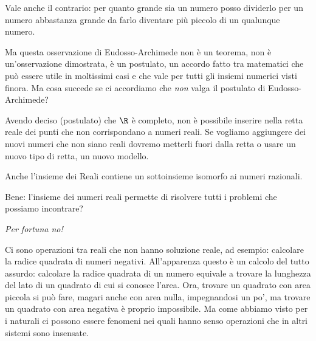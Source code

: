 Vale anche il contrario: per quanto grande sia un numero posso dividerlo per un 
numero abbastanza grande da farlo diventare più piccolo di un qualunque numero.

Ma questa osservazione di Eudosso-Archimede non è un teorema, non è 
un'osservazione dimostrata, è un postulato, un accordo fatto tra matematici che 
può essere utile in moltissimi casi e che vale per tutti gli insiemi numerici 
visti finora. Ma cosa succede se ci accordiamo che \emph{non} valga il 
postulato di Eudosso-Archimede? 

Avendo deciso (postulato) che \(\R\) è completo, non è possibile inserire nella 
retta reale dei punti che non corrispondano a numeri reali. Se vogliamo 
aggiungere dei nuovi numeri che non siano reali dovremo metterli fuori dalla 
retta o usare un nuovo tipo di retta, un nuovo modello.
% 
% 

Anche l'insieme dei Reali contiene un sottoinsieme isomorfo ai numeri razionali.

Bene: l'insieme dei numeri reali permette di risolvere tutti i problemi che 
possiamo incontrare? 

\vspace{-1em} \begin{center} \emph{Per fortuna no!} \end{center} \vspace{-.5em} 

Ci sono operazioni tra reali che non hanno soluzione reale, 
ad esempio: calcolare la radice quadrata di numeri negativi. 
All'apparenza questo è un calcolo del tutto assurdo: calcolare la radice 
quadrata di un numero equivale a trovare la lunghezza del lato di un quadrato di 
cui si conosce l'area.
Ora, trovare un quadrato con area piccola si può fare, magari anche con area 
nulla, impegnandosi un po', ma trovare un quadrato con area negativa è proprio 
impossibile. Ma come abbiamo visto per i naturali ci possono essere fenomeni 
nei quali hanno senso operazioni che in altri sistemi sono insensate.

